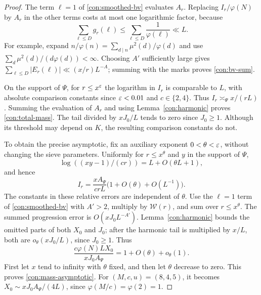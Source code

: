 \begin{proof}
The term \(\ell=1\) of \eqref{con:smoothed-bv} evaluates \(A_r\).
Replacing \(I_r/\varphi(N)\) by \(A_r\) in the other terms costs
at most one logarithmic factor, because
\[
 \sum_{\ell\le D}g_r(\ell)\le\sum_{\ell\le D}\frac1{\varphi(\ell)}
       \ll L.
\]
For example, expand
\(n/\varphi(n)=\sum_{d\mid n}\mu^2(d)/\varphi(d)\) and use
\(\sum_d\mu^2(d)/(d\varphi(d))<\infty\).
Choosing \(A'\) sufficiently large gives
\(\sum_{\ell\le D}|E_r(\ell)|\ll(x/r)L^{-A}\); summing with
the marks proves \eqref{con:bv-sum}.

On the support of \(\Psi\), for \(r\le x^\varepsilon\) the logarithm
in \(I_r\) is comparable to \(L\), with absolute comparison
constants since \(\varepsilon<0.01\) and \(c\in\{2,4\}\).  Thus
\(I_r\asymp_\Psi x/(rL)\).  Summing the evaluation of \(A_r\)
and using Lemma~\ref{con:harmonic} proves \eqref{con:total-mass}.
The tail divided by \(xJ_0/L\) tends to zero since \(J_0\ge1\).
Although its threshold may depend on \(K\), the resulting comparison
constants do not.

To obtain the precise asymptotic, fix an auxiliary exponent
\(0<\theta<\varepsilon\), without changing the sieve parameters.
Uniformly for \(r\le x^\theta\) and \(y\) in the support of \(\Psi\),
\[
 \log((xy-1)/(cr))=L+O(\theta L+1),
\]
and hence
\[
 I_r=\frac{xA_\Psi}{crL}
             \bigl(1+O(\theta)+O(L^{-1})\bigr).
\]
The constants in these relative errors are independent of \(\theta\).
Use the \(\ell=1\) term of \eqref{con:smoothed-bv} with \(A'>2\),
multiply by \(\mathcal W(r)\), and sum over \(r\le x^\theta\).
The summed progression error is \(O(xJ_0L^{-A'})\).
Lemma~\ref{con:harmonic} bounds the omitted parts of both \(X_0\)
and \(J_0\); after the harmonic tail is multiplied by \(x/L\),
both are \(o_\theta(xJ_0/L)\), since \(J_0\ge1\). Thus
\[
 \frac{c\varphi(N)L X_0}{xJ_0A_\Psi}
       =1+O(\theta)+o_\theta(1).
\]
First let \(x\) tend to infinity with \(\theta\) fixed, and then
let \(\theta\) decrease to zero. This proves
\eqref{con:mass-asymptotic}. For \((M,c,u)=(8,4,5)\), it becomes
\(X_0\sim xJ_0A_\Psi/(4L)\), since \(\varphi(M/c)=\varphi(2)=1\).
\end{proof}

